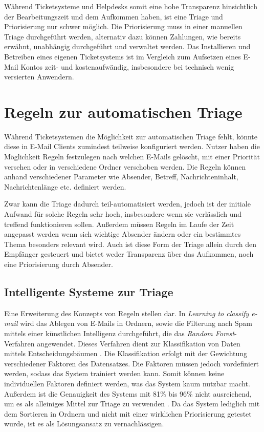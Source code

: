 Während Ticketsysteme und Helpdesks somit eine hohe Transparenz hinsichtlich der Bearbeitungszeit und dem Aufkommen haben, ist eine Triage und Priorisierung nur schwer möglich. Die Priorisierung muss in einer manuellen Triage durchgeführt werden, alternativ dazu können Zahlungen, wie bereits erwähnt, unabhängig durchgeführt und verwaltet werden. Das Installieren und Betreiben eines eigenen Ticketsystems ist im Vergleich zum Aufsetzen eines E-Mail Kontos zeit- und kostenaufwändig, insbesondere bei technisch wenig versierten Anwendern.


\section{Regeln zur automatischen Triage}
Während Ticketsystemen die Möglichkeit zur automatischen Triage fehlt, könnte diese in E-Mail Clients zumindest teilweise konfiguriert werden. Nutzer haben die Möglichkeit Regeln festzulegen nach welchen E-Mails gelöscht, mit einer Priorität versehen oder in verschiedene Ordner verschoben werden. Die Regeln können anhand verschiedener Parameter wie Absender, Betreff, Nachrichteninhalt, Nachrichtenlänge etc. definiert werden.

Zwar kann die Triage dadurch teil-automatisiert werden, jedoch ist der initiale Aufwand für solche Regeln sehr hoch, insbesondere wenn sie verlässlich und treffend funktionieren sollen. Außerdem müssen Regeln im Laufe der Zeit angepasst werden wenn sich wichtige Absender ändern oder ein bestimmtes Thema besonders relevant wird. Auch ist diese Form der Triage allein durch den Empfänger gesteuert und bietet weder Transparenz über das Aufkommen, noch eine Priorisierung durch Absender.

\subsection{Intelligente Systeme zur Triage}

Eine Erweiterung des Konzepts von Regeln stellen \cite{Koprinska2007} dar. In \textit{Learning to classify e-mail} wird das Ablegen von E-Mails in Ordnern, sowie die Filterung nach Spam mittels einer künstlichen Intelligenz durchgeführt, die das \textit{Random Forest}-Verfahren angewendet. Dieses Verfahren dient zur Klassifikation von Daten mittels Entscheidungsbäumen \citep[S. 5 f.]{Breiman2001}. Die Klassifikation erfolgt mit der Gewichtung verschiedener Faktoren des Datensatzes. Die Faktoren müssen jedoch vordefiniert werden, sodass das System trainiert werden kann. Somit können keine individuellen Faktoren definiert werden, was das System kaum nutzbar macht. Außerdem ist die Genauigkeit des Systems mit 81\% bis 96\% nicht ausreichend, um es als alleiniges Mittel zur Triage zu verwenden \citep[S. 2174]{Koprinska2007}. Da das System lediglich mit dem Sortieren in Ordnern und nicht mit einer wirklichen Priorisierung getestet wurde, ist es als Lösungsansatz zu vernachlässigen.

